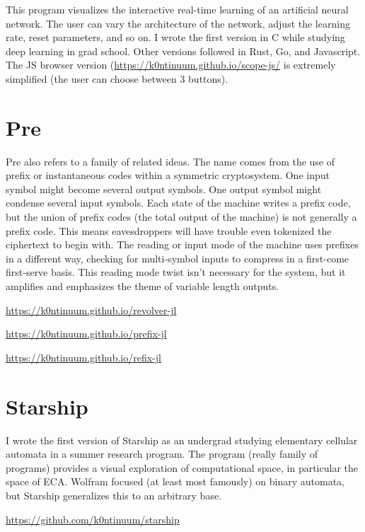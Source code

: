 \documentclass{article}
\begin{document}
{{This program visualizes the interactive real-time learning of an artificial neural network. The user can vary the architecture of the network, adjust the learning rate, reset parameters, and so on.  I wrote the first version in C while studying deep learning in grad school. Other versions followed in Rust, Go, and Javascript. The JS browser version (\url{https://k0ntinuum.github.io/scope-js/} is extremely simplified (the user can choose between $3$ buttons). 


\section*{Pre}
Pre also refers to a family of related ideas. The name comes from the use of prefix or instantaneous codes within a symmetric cryptosystem. One input symbol might become several output symbols. One output symbol might condense several input symbols. Each state of the machine writes a prefix code, but the union of prefix codes (the total output of the machine) is not generally a prefix code. This means eavesdroppers will have trouble even tokenized the ciphertext to begin with. The reading or input mode of the machine uses prefixes in a different way, checking for multi-symbol inputs to compress in a first-come first-serve basis. This reading mode twist isn't necessary for the system, but it amplifies and emphasizes the theme of variable length outputs.  

\url{https://k0ntinuum.github.io/revolver-jl}

\url{https://k0ntinuum.github.io/prefix-jl}

\url{https://k0ntinuum.github.io/refix-jl}


\section*{Starship}

I wrote the first version of Starship as an undergrad studying elementary cellular automata in a summer research program. The program (really family of programs) provides a visual exploration of computational space, in particular the space of ECA. Wolfram focused (at least most famously) on binary automata, but Starship generalizes this to an arbitrary base.

\url{https://github.com/k0ntinuum/starship}










}}
\end{document}
